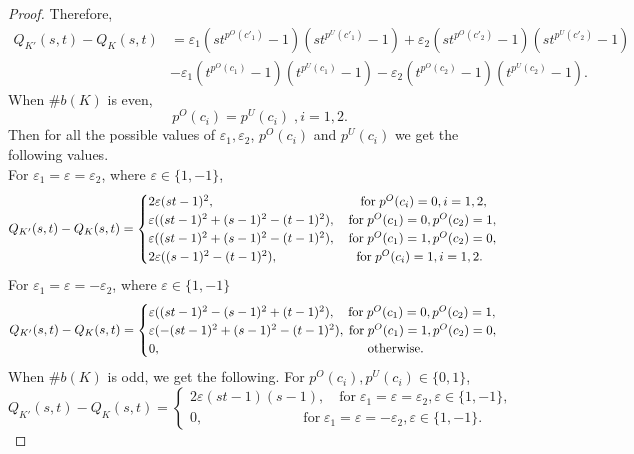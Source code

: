 \documentclass[10pt,a4paper,reqno]{amsart}
\theoremstyle{definition}
\theoremstyle{remark}
\begin{document}
\begin{proof}
		Therefore, \begin{align*}
			Q_{K'}(s,t)-Q_{K}(s,t) &=\varepsilon_{1}(st^{p^{O}(c'_{1})}-1)(st^{p^{U}(c'_{1})}-1)+\varepsilon_{2}(st^{p^{O}(c'_{2})}-1)(st^{p^{U}(c'_{2})}-1)\\ &-\varepsilon_{1}(t^{p^{O}(c_{1})}-1)(t^{p^{U}(c_{1})}-1)-\varepsilon_{2}(t^{p^{O}(c_{2})}-1)(t^{p^{U}(c_{2})}-1).
		\end{align*}
	 When $\# b(K)$ is even, \[p^{O}(c_i)=p^{U}(c_i)\; , i=1,2.\]
		Then for all the possible values of $\varepsilon_{1}, \varepsilon_{2}$, $p^{O}(c_i)$ and  $p^{U}(c_i)$ we get the following values.\\
		For $\varepsilon_{1}=\varepsilon=\varepsilon_{2}$, where $\varepsilon \in \{1,-1\}$,
		$$Q_{K'}(s,t)-Q_{K}(s,t)
		=\begin{cases}
			2\varepsilon(st-1)^{2}, \hspace{4cm} \text{for} \; p^{O}(c_i)=0, i=1,2,\\
			\varepsilon ((st-1)^{2}+(s-1)^{2}-(t-1)^{2}) , \quad \text{for} \; p^{O}(c_1)=0, p^{O}(c_2)=1,\\
			\varepsilon ((st-1)^{2}+(s-1)^{2}-(t-1)^{2}), \quad \text{for} \; p^{O}(c_1)=1, p^{O}(c_2)=0,\\
			2\varepsilon((s-1)^{2}-(t-1)^{2}), \hspace{2.15cm} \text{for} \; p^{O}(c_i)=1, i=1,2.
		\end{cases}
		$$
		For $\varepsilon_{1}=\varepsilon=-\varepsilon_{2}$, where $\varepsilon \in \{1,-1\}$  \\
		$$Q_{K'}(s,t)-Q_{K}(s,t)
		=\begin{cases}
	\varepsilon ((st-1)^{2}-(s-1)^{2}+(t-1)^{2}) , \quad \text{for} \; p^{O}(c_1)=0, p^{O}(c_2)=1,\\
	\varepsilon (-(st-1)^{2}+(s-1)^{2}-(t-1)^{2}), \; \text{for} \; p^{O}(c_1)=1, p^{O}(c_2)=0,\\
0, \hspace{5.7cm} \text{otherwise}.
		\end{cases}
		$$
	When $\#b(K)$ is odd, we get the following.
		For $p^{O}(c_i),p^{U}(c_i) \in \{0,1\}$,
		$$Q_{K'}(s,t)-Q_{K}(s,t)=\begin{cases}
			2\varepsilon(st-1)(s-1),  \quad \text{for} \; \varepsilon_{1}=\varepsilon=\varepsilon_{2}, \varepsilon \in \{1,-1\},\\
			0,  \hspace{3cm} \text{for} \; \varepsilon_{1}=\varepsilon=-\varepsilon_{2},   \varepsilon \in \{1,-1\}.
		\end{cases}	$$

\end{proof}
\end{document}
